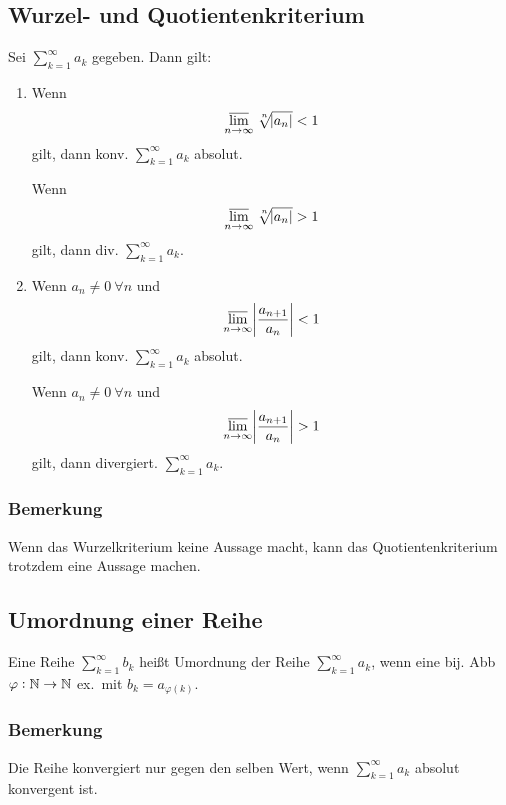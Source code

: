 \subsection{Wurzel- und Quotientenkriterium}
Sei $\sum_{k=1}^\infty a_k$ gegeben. Dann gilt:
\begin{enumerate}[label= (\alph*)]
    \item Wenn
        \begin{equation*}
            \varlimsup_{n \rightarrow \infty}
            \nthSqrt{n}{\abs{a_n}} < 1
        \end{equation*}
        gilt, dann konv. $\sum_{k=1}^\infty a_k$ absolut.

        Wenn
        \begin{equation*}
            \varlimsup_{n \rightarrow \infty}
            \nthSqrt{n}{\abs{a_n}} > 1
        \end{equation*}
        gilt, dann div. $\sum_{k=1}^\infty a_k$.
    \item Wenn $a_n \neq 0\ \forall n$ und
        \begin{equation*}
            \varlimsup_{n \rightarrow \infty}
            \abs{\frac{a_{n+1}}{a_n}} < 1
        \end{equation*}
        gilt, dann konv. $\sum_{k=1}^\infty a_k$ absolut.

        Wenn $a_n \neq 0\ \forall n$ und
        \begin{equation*}
            \varlimsup_{n \rightarrow \infty}
            \abs{\frac{a_{n+1}}{a_n}} > 1
        \end{equation*}
        gilt, dann divergiert. $\sum_{k=1}^\infty a_k$.
\end{enumerate}
\subsubsection{Bemerkung} Wenn das Wurzelkriterium keine Aussage macht, kann das
Quotientenkriterium trotzdem eine Aussage machen.

\subsection{Umordnung einer Reihe}
Eine Reihe $\sum_{k=1}^\infty b_k$ heißt Umordnung der Reihe
$\sum_{k=1}^\infty a_k$,
wenn eine bij. Abb $\varphi: \mathbb{N} \rightarrow \mathbb{N}$ ex.\ mit $b_k = a_{\varphi(k)}$.

\subsubsection{Bemerkung}
Die Reihe konvergiert nur gegen den selben Wert, wenn $\sum_{k=1}^\infty a_k$
absolut konvergent ist.

